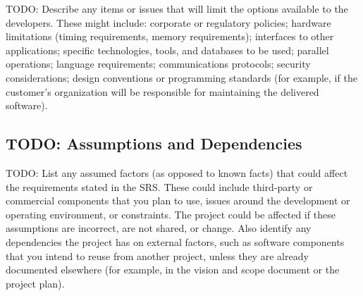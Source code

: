 TODO: Describe any items or issues that will limit the options available to the developers. These might include: corporate or regulatory policies; hardware limitations (timing requirements, memory requirements); interfaces to other applications; specific technologies, tools, and databases to be used; parallel operations; language requirements; communications protocols; security considerations; design conventions or programming standards (for example, if the customer’s organization will be responsible for maintaining the delivered software).
\subsection{TODO: Assumptions and Dependencies}
TODO: List any assumed factors (as opposed to known facts) that could affect the requirements stated in the SRS. These could include third-party or commercial components that you plan to use, issues around the development or operating environment, or constraints. The project could be affected if these assumptions are incorrect, are not shared, or change. Also identify any dependencies the project has on external factors, such as software components that you intend to reuse from another project, unless they are already documented elsewhere (for example, in the vision and scope document or the project plan).